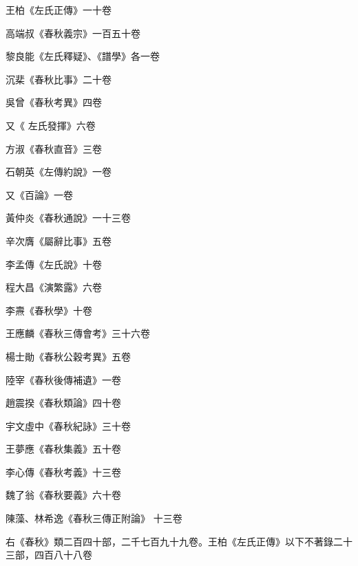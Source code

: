 \begin{pinyinscope}
 王柏《左氏正傳》一十卷



 高端叔《春秋義宗》一百五十卷



 黎良能《左氏釋疑》、《譜學》各一卷



 沉棐《春秋比事》二十卷



 吳曾《春秋考異》四卷



 又《
 左氏發揮》六卷



 方淑《春秋直音》三卷



 石朝英《左傳約說》一卷



 又《百論》一卷



 黃仲炎《春秋通說》一十三卷



 辛次膺《屬辭比事》五卷



 李孟傳《左氏說》十卷



 程大昌《演繁露》六卷



 李燾《春秋學》十卷



 王應麟《春秋三傳會考》三十六卷



 楊士勛《春秋公穀考異》五卷



 陸宰《春秋後傳補遺》一卷



 趙震揆《春秋類論》四十卷



 宇文虛中《春秋紀詠》三十卷



 王夢應《春秋集義》五十卷



 李心傳《春秋考義》十三卷



 魏了翁《春秋要義》六十卷



 陳藻、林希逸《春秋三傳正附論》
 十三卷



 右《春秋》類二百四十部，二千七百九十九卷。王柏《左氏正傳》以下不著錄二十三部，四百八十八卷




\end{pinyinscope}
